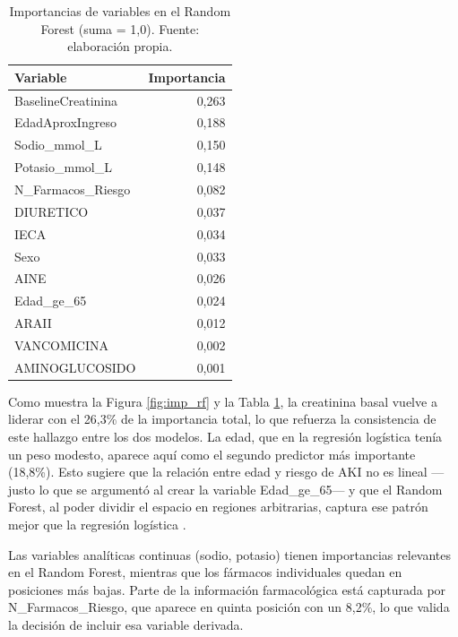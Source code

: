 \documentclass[12pt, a4paper, oneside]{report}
\begin{document}
\begin{table}[h]
    \centering
    \begin{tabular}{lr}
        \toprule
        \textbf{Variable} & \textbf{Importancia} \\
        \midrule
        BaselineCreatinina  & 0,263 \\
        EdadAproxIngreso    & 0,188 \\
        Sodio\_mmol\_L      & 0,150 \\
        Potasio\_mmol\_L    & 0,148 \\
        N\_Farmacos\_Riesgo & 0,082 \\
        DIURETICO           & 0,037 \\
        IECA                & 0,034 \\
        Sexo                & 0,033 \\
        AINE                & 0,026 \\
        Edad\_ge\_65        & 0,024 \\
        ARAII               & 0,012 \\
        VANCOMICINA         & 0,002 \\
        AMINOGLUCOSIDO      & 0,001 \\
        \bottomrule
    \end{tabular}
    \caption{Importancias de variables en el Random Forest (suma = 1,0). Fuente: elaboración propia.}
    \label{tab:imp_rf}
\end{table}

Como muestra la Figura \ref{fig:imp_rf} y la Tabla \ref{tab:imp_rf}, la creatinina basal vuelve a liderar con el 26,3\% de la importancia total, lo que refuerza la consistencia de este hallazgo entre los dos modelos. La edad, que en la regresión logística tenía un peso modesto, aparece aquí como el segundo predictor más importante (18,8\%). Esto sugiere que la relación entre edad y riesgo de AKI no es lineal —justo lo que se argumentó al crear la variable Edad\_ge\_65— y que el Random Forest, al poder dividir el espacio en regiones arbitrarias, captura ese patrón mejor que la regresión logística \parencite{couronne2018rflr}.

Las variables analíticas continuas (sodio, potasio) tienen importancias relevantes en el Random Forest, mientras que los fármacos individuales quedan en posiciones más bajas. Parte de la información farmacológica está capturada por N\_Farmacos\_Riesgo, que aparece en quinta posición con un 8,2\%, lo que valida la decisión de incluir esa variable derivada.
\end{document}
